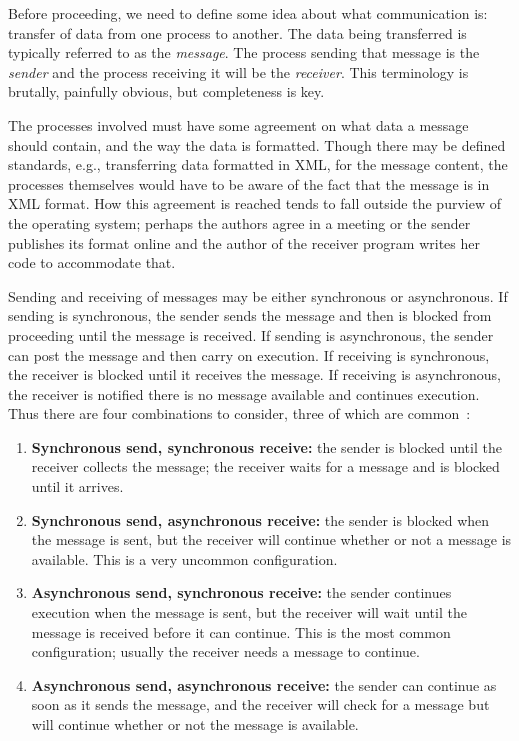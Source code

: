 \documentclass[a4paper]{report}
\begin{document}
Before proceeding, we need to define some idea about what communication is: transfer of data from one process to another. The data being transferred is typically referred to as the \textit{message}. The process sending that message is the \textit{sender} and the process receiving it will be the \textit{receiver}. This terminology is brutally, painfully obvious, but completeness is key.

The processes involved must have some agreement on what data a message should contain, and the way the data is formatted. Though there may be defined standards, e.g., transferring data formatted in XML, for the message content, the processes themselves would have to be aware of the fact that the message is in XML format. How this agreement is reached tends to fall outside the purview of the operating system; perhaps the authors agree in a meeting or the sender publishes its format online and the author of the receiver program writes her code to accommodate that.

Sending and receiving of messages may be either synchronous or asynchronous. If sending is synchronous, the sender sends the message and then is blocked from proceeding until the message is received. If sending is asynchronous, the sender can post the message and then carry on execution. If receiving is synchronous, the receiver is blocked until it receives the message. If receiving is asynchronous, the receiver is notified there is no message available and continues execution. Thus there are four combinations to consider, three of which are common~\cite{mte241}:

\begin{enumerate}
	\item \textbf{Synchronous send, synchronous receive:} the sender is blocked until the receiver collects the message; the receiver waits for a message and is blocked until it arrives.
	\item \textbf{Synchronous send, asynchronous receive:} the sender is blocked when the message is sent, but the receiver will continue whether or not a message is available. This is a very uncommon configuration.
	\item \textbf{Asynchronous send, synchronous receive:} the sender continues execution when the message is sent, but the receiver will wait until the message is received before it can continue. This is the most common configuration; usually the receiver needs a message to continue.
	\item \textbf{Asynchronous send, asynchronous receive:} the sender can continue as soon as it sends the message, and the receiver will check for a message but will continue whether or not the message is available.
\end{enumerate}
\end{document}
